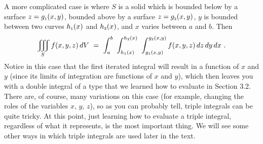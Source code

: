 A more complicated case is where $S$ is a solid which is bounded below by a surface $z=g_{\scriptscriptstyle 1}(x,y)$, bounded above
by a surface $z=g_{\scriptscriptstyle 2}(x,y)$, $y$ is bounded between two curves $h_{\scriptscriptstyle 1}(x)$ and $h_{\scriptscriptstyle 2}(x)$, and $x$
varies between $a$ and $b$. Then
\begin{equation}\label{eqn:vsolid}
 \iiint\limits_{S} f(x,y,z)\,dV 
 ~=~
 \int_{a}^{b}
 \,\, 
 \int_{h_{\scriptscriptstyle 1}(x)}^{h_{\scriptscriptstyle 2}(x)}
 \,\,
 \int_{g_{\scriptscriptstyle 1}(x,y)}^{g_{\scriptscriptstyle 2}(x,y)} f(x,y,z)\,
  dz\,dy\,dx ~.
\end{equation}
Notice in this case that the first iterated integral will result in a function of $x$ and $y$ (since its limits
of integration are functions of $x$ and $y$), which then leaves you with a double integral of a type that we learned
how to evaluate in Section 3.2. There are, of course, many variations on this case (for example, changing the roles of
the variables $x$, $y$, $z$), so as you can probably tell, triple integrals can be quite tricky. At this point, just
learning how to evaluate a triple integral, regardless of what it represents, is the most important thing. We will see
some other ways in which triple integrals are used later in the text.

